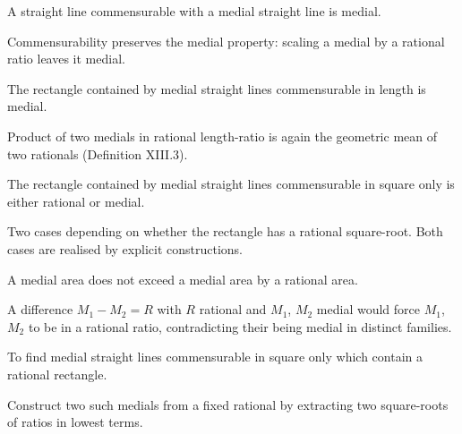 \documentclass{rrxiv}
\begin{document}
\begin{claim}
\label{prop:X.23}
A straight line commensurable with a medial straight line is medial.
\end{claim}
\begin{evidence}[Proof of X.23]
\label{ev:X.23}
Commensurability preserves the medial property: scaling a medial by
a rational ratio leaves it medial.
\end{evidence}

\begin{claim}
\label{prop:X.24}
The rectangle contained by medial straight lines commensurable in
length is medial.
\end{claim}
\begin{evidence}[Proof of X.24]
\label{ev:X.24}
Product of two medials in rational length-ratio is again the
geometric mean of two rationals (Definition XIII.3).
\end{evidence}

\begin{claim}
\label{prop:X.25}
The rectangle contained by medial straight lines commensurable in
square only is either rational or medial.
\end{claim}
\begin{evidence}[Proof of X.25]
\label{ev:X.25}
Two cases depending on whether the rectangle has a rational
square-root.  Both cases are realised by explicit constructions.
\end{evidence}

\begin{claim}
\label{prop:X.26}
A medial area does not exceed a medial area by a rational area.
\end{claim}
\begin{evidence}[Proof of X.26]
\label{ev:X.26}
A difference $M_1 - M_2 = R$ with $R$ rational and $M_1$, $M_2$
medial would force $M_1$, $M_2$ to be in a rational ratio,
contradicting their being medial in distinct families.
\end{evidence}

\begin{claim}
\label{prop:X.27}
To find medial straight lines commensurable in square only which
contain a rational rectangle.
\end{claim}
\begin{evidence}[Proof of X.27]
\label{ev:X.27}
Construct two such medials from a fixed rational by extracting two
square-roots of ratios in lowest terms.
\end{evidence}
\end{document}
